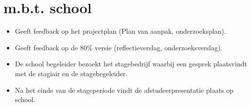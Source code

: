 \newpage
\section{m.b.t. school}
\begin{itemize}
\item Geeft feedback op het projectplan (Plan van aanpak, onderzoeksplan).
\item Geeft feedback op de 80\% versie (reflectieverslag, onderzoeksverslag).
\item De school begeleider bezoekt het stagebedrijf waarbij een gesprek plaatsvindt met de stagiair en de stagebegeleider.
\item Na het einde van de stageperiode vindt de afstudeerpresentatie plaats op school.
\end{itemize}